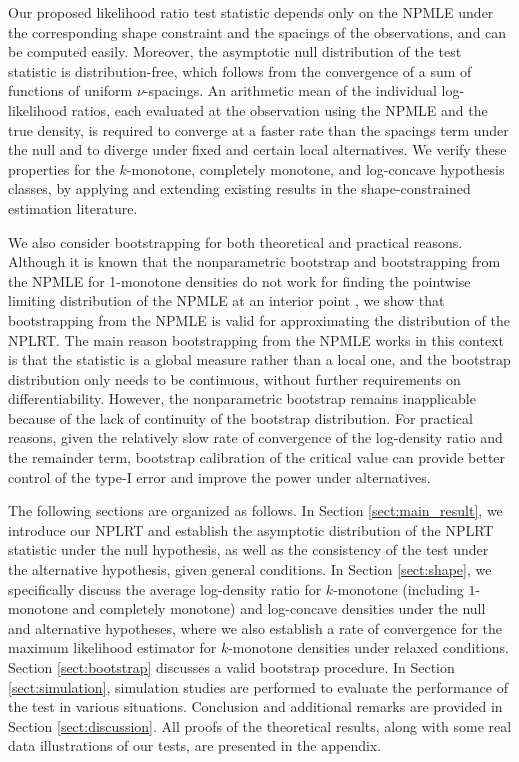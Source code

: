\documentclass[12pt,letterpaper, twoside, openany]{article}
\theoremstyle{plain}
\begin{document}
Our proposed likelihood ratio test statistic depends only on the NPMLE under the corresponding shape constraint and the spacings of the observations, and can be computed easily. Moreover, the asymptotic null distribution of the test statistic is distribution-free, which follows from the convergence of a sum of functions of uniform $\nu$-spacings.  
An arithmetic mean of the individual log-likelihood ratios, each evaluated at the observation using the NPMLE and the true density, is required to converge at a faster rate than the spacings term under the null and to diverge under fixed and certain local alternatives.  We verify these properties for the $k$-monotone, completely monotone, and log-concave hypothesis classes, by applying and extending existing results in the shape-constrained estimation literature.

We also consider bootstrapping for both theoretical and practical reasons.  Although it is known that the nonparametric bootstrap and bootstrapping from the NPMLE for 1-monotone densities do not work for finding the pointwise limiting distribution of the NPMLE at an interior point \citep{kosorok2008bootstrapping, sen2010inconsistency}, we show that bootstrapping from the NPMLE is valid for approximating the distribution of the NPLRT.  The main reason bootstrapping from the NPMLE works in this context is that the statistic is a global measure rather than a local one, and the bootstrap distribution only needs to be continuous, without further requirements on differentiability.
However, the nonparametric bootstrap remains inapplicable because of the lack of continuity of the bootstrap distribution. 
For practical reasons, given the relatively slow rate of convergence of the log-density ratio and the remainder term, bootstrap calibration of the critical value can provide better control of the type-I error and improve the power under alternatives.

The following sections are organized as follows. In Section \ref{sect:main_result}, we introduce our NPLRT and establish the asymptotic distribution of the NPLRT statistic under the null hypothesis, as well as the consistency of the test under the alternative hypothesis, given general conditions. In Section \ref{sect:shape}, we specifically discuss the average log-density ratio for $k$-monotone (including $1$-monotone and completely monotone) and log-concave densities under the null and alternative hypotheses, where we also  establish a rate of convergence for the maximum likelihood estimator for $k$-monotone densities under relaxed conditions. 
Section \ref{sect:bootstrap} discusses a valid bootstrap procedure. In Section \ref{sect:simulation}, simulation studies are performed to evaluate the performance of the test in various situations. 
Conclusion and additional remarks are provided in Section \ref{sect:discussion}.
All proofs of the theoretical results, along with some real data illustrations of our tests, are presented in the appendix.
\end{document}
